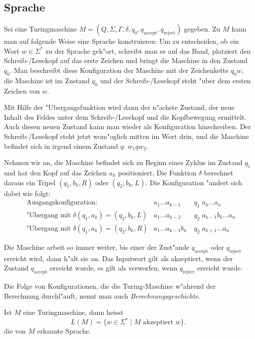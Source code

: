\subsection{Sprache}
Sei eine Turingmaschine 
$M=(Q,\Sigma,\Gamma,\delta,q_0,q_{\text{accept}},q_{\text{reject}})$
gegeben.
Zu $M$ kann man auf folgende Weise eine Sprache konstruieren:
Um zu entscheiden, ob ein Wort $w\in\Sigma^*$
zu der Sprache geh"ort,
schreibt man es auf das Band, platziert den Schreib-/Lesekopf auf
das erste Zeichen und bringt die Maschine in den Zustand $q_0$.
Man beschreibt diese Konfiguration der Maschine mit der Zeichenkette
$q_0w$, die Maschine ist im Zustand $q_0$ und der Schreib-/Lesekopf
steht "uber dem ersten Zeichen von $w$.

Mit Hilfe der "Ubergangsfunktion wird dann der n"achste Zustand,
der neue Inhalt des Feldes unter dem Schreib-/Lesekopf und die
Kopfbewegung ermittelt. Auch diesen neuen Zustand kann man wieder
als Konfiguration hinschreiben. Der Schreib-/Lesekopf steht
jetzt wom"oglich mitten im Wort drin, und die Maschine befindet
sich in irgend einem Zustand $q$: $w_1qw_2$.

Nehmen wir an, die Maschine befindet sich zu Beginn eines Zyklus im 
Zustand $q_1$ und hat den Kopf auf das Zeichen $a_k$ positioniert.
Die Funktion $\delta$ berechnet daraus ein Tripel $(q_1,b_k,R)$ 
oder $(q_2,b_k,L)$. Die Konfiguration "andert sich dabei wie
folgt:
\begin{align*}
&\text{Ausgangskonfiguration:}&a_1\dots a_{k-1}&\;q_1\;a_k\dots a_n\\
&\text{"Ubergang mit } \delta(q_1,a_k)=(q_2,b_k,L)&a_1\dots a_{k-2}&\;q_2\;a_{k-1}b_k\dots a_n\\
&\text{"Ubergang mit } \delta(q_1,a_k)=(q_2,b_k,R)&a_1\dots a_{k-1}b_k&\;q_2\;a_{k+1}\dots a_n
\end{align*}

Die Maschine arbeit so immer weiter, bis einer der Zust"ande $q_{\text{accept}}$
oder $q_{\text{reject}}$ erreicht wird, dann h"alt sie an.
Das Inputwort gilt als akzeptiert, wenn der Zustand $q_{\text{accept}}$
erreicht wurde, es gilt als verworfen, wenn $q_{\text{reject}}$ erreicht
wurde.

Die Folge von Konfigurationen, die die Turing-Maschine
w"ahrend der Berechnung durchl"auft, nennt man auch
{\em Berechnungsgeschichte}.

\begin{definition}
Ist $M$ eine Turingmaschine, dann heisst
\[
L(M)=\{w\in\Sigma^*\;|\;\text{$M$ akzeptiert $w$}\}.
\]
die von $M$ erkannte Sprache.
\end{definition}

